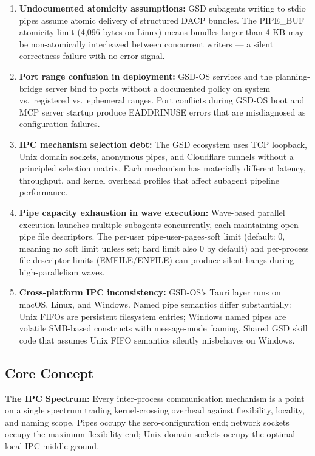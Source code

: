 \documentclass[11pt,letterpaper]{article}
\begin{document}
\begin{enumerate}
  \item \textbf{Undocumented atomicity assumptions:} GSD subagents writing to stdio pipes assume atomic delivery of structured DACP bundles. The PIPE\_BUF atomicity limit (4,096 bytes on Linux) means bundles larger than 4 KB may be non-atomically interleaved between concurrent writers --- a silent correctness failure with no error signal.
  
  \item \textbf{Port range confusion in deployment:} GSD-OS services and the planning-bridge server bind to ports without a documented policy on system vs.\ registered vs.\ ephemeral ranges. Port conflicts during GSD-OS boot and MCP server startup produce EADDRINUSE errors that are misdiagnosed as configuration failures.
  
  \item \textbf{IPC mechanism selection debt:} The GSD ecosystem uses TCP loopback, Unix domain sockets, anonymous pipes, and Cloudflare tunnels without a principled selection matrix. Each mechanism has materially different latency, throughput, and kernel overhead profiles that affect subagent pipeline performance.
  
  \item \textbf{Pipe capacity exhaustion in wave execution:} Wave-based parallel execution launches multiple subagents concurrently, each maintaining open pipe file descriptors. The per-user pipe-user-pages-soft limit (default: 0, meaning no soft limit unless set; hard limit also 0 by default) and per-process file descriptor limits (EMFILE/ENFILE) can produce silent hangs during high-parallelism waves.
  
  \item \textbf{Cross-platform IPC inconsistency:} GSD-OS's Tauri layer runs on macOS, Linux, and Windows. Named pipe semantics differ substantially: Unix FIFOs are persistent filesystem entries; Windows named pipes are volatile SMB-based constructs with message-mode framing. Shared GSD skill code that assumes Unix FIFO semantics silently misbehaves on Windows.
\end{enumerate}

\subsection{Core Concept}

\textbf{The IPC Spectrum:} Every inter-process communication mechanism is a point on a single spectrum trading kernel-crossing overhead against flexibility, locality, and naming scope. Pipes occupy the zero-configuration end; network sockets occupy the maximum-flexibility end; Unix domain sockets occupy the optimal local-IPC middle ground.
\end{document}
